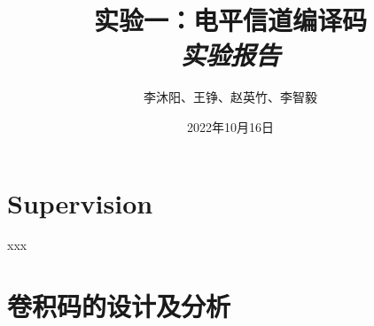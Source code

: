 \documentclass{article}
\title{\textbf{实验一：电平信道编译码}\\
        \Large \emph{实验报告}}
\author{李沐阳、王铮、赵英竹、李智毅}
\date{2022年10月16日}
\begin{document}
\maketitle
\thispagestyle{firstpage}

\section*{Supervision}

xxx

\section*{卷积码的设计及分析}



\end{document}
